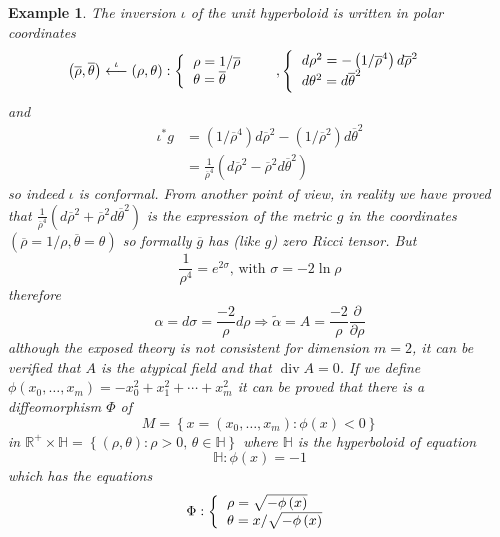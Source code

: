 \documentclass{amsart}%
\theoremstyle{plain}
\newtheorem{example}{Example}
\numberwithin{equation}{section}
\begin{document}
\begin{example}
The inversion $\iota$ of the unit hyperboloid is written in polar coordinates
\[
\left(  \overline{\rho},\overline{\theta}\right)  \overset{\iota
}{\longleftarrow}\left(  \rho,\theta\right)  :\left\{
\begin{tabular}
[c]{l}%
$\rho=1/\overline{\rho}$\\
$\theta=\overline{\theta}$%
\end{tabular}
\ \ \ \ \ \right.  ,\left\{
\begin{tabular}
[c]{l}%
$d\rho^{2}=-\left(  1/\overline{\rho}^{4}\right)  d\overline{\rho}^{2}$\\
$d\theta^{2}=d\overline{\theta}^{2}$%
\end{tabular}
\ \ \ \ \ \right.
\]
and
\begin{align*}
\iota^{\ast}g  &  =\left(  1/\overline{\rho}^{4}\right)  d\overline{\rho}%
^{2}-\left(  1/\overline{\rho}^{2}\right)  d\overline{\theta}^{2}\\
&  =\frac{1}{\overline{\rho}^{4}}\left(  d\overline{\rho}^{2}-\overline{\rho
}^{2}d\overline{\theta}^{2}\right)
\end{align*}
so indeed $\iota$ is conformal. From another point of view, in reality we have
proved that $\frac{1}{\overline{\rho}^{4}}\left(  d\overline{\rho}%
^{2}+\overline{\rho}^{2}d\overline{\theta}^{2}\right)  $ is the expression of
the metric $g$ in the coordinates $\left(  \overline{\rho}=1/\rho
,\overline{\theta}=\theta\right)  $ so formally $\overline{g}$ has (like $g$)
zero Ricci tensor. But%
\[
\frac{1}{\rho^{4}}=e^{2\sigma}\text{, with }\sigma=-2\ln\rho
\]
therefore
\[
\alpha=d\sigma=\frac{-2}{\rho}d\rho\Rightarrow\widetilde{\alpha}=A=\frac
{-2}{\rho}\frac{\partial}{\partial\rho}%
\]
although the exposed theory is not consistent for dimension $m=2$, it can be
verified that $A$ is the atypical field and that $\operatorname{div}A=0$. If
we define $\phi\left(  x_{0},\ldots,x_{m}\right)  =-x_{0}^{2}+x_{1}^{2}%
+\cdots+x_{m}^{2}$ it can be proved that there is a diffeomorphism $\Phi$ of
\[
M=\left\{  x=\left(  x_{0},\ldots,x_{m}\right)  :\phi\left(  x\right)
<0\right\}
\]
in $\mathbb{R}^{+}\times\mathbb{H}=\left\{  \left(  \rho,\theta\right)
:\rho>0\text{, }\theta\in\mathbb{H}\right\}  $ where $\mathbb{H}$ is the
hyperboloid of equation
\[
\mathbb{H}:\phi\left(  x\right)  =-1
\]
which has the equations
\[
\Phi:\left\{
\begin{tabular}
[c]{l}%
$\rho=\sqrt{-\phi\left(  x\right)  }$\\
$\theta=x/\sqrt{-\phi\left(  x\right)  }$%
\end{tabular}
\right.
\]



\end{example}
\end{document}
